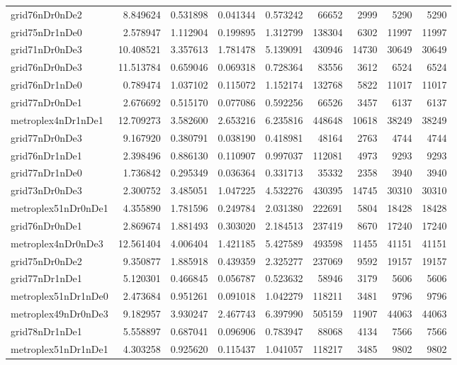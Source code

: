 \begin{longtable}{|l|r|r|r|r|r|r|r|r|}
grid76nDr0nDe2 & 8.849624 & 0.531898 & 0.041344 & 0.573242 & 66652 & 2999 & 5290 & 5290 \\
grid75nDr1nDe0 & 2.578947 & 1.112904 & 0.199895 & 1.312799 & 138304 & 6302 & 11997 & 11997 \\
grid71nDr0nDe3 & 10.408521 & 3.357613 & 1.781478 & 5.139091 & 430946 & 14730 & 30649 & 30649 \\
grid76nDr0nDe3 & 11.513784 & 0.659046 & 0.069318 & 0.728364 & 83556 & 3612 & 6524 & 6524 \\
grid76nDr1nDe0 & 0.789474 & 1.037102 & 0.115072 & 1.152174 & 132768 & 5822 & 11017 & 11017 \\
grid77nDr0nDe1 & 2.676692 & 0.515170 & 0.077086 & 0.592256 & 66526 & 3457 & 6137 & 6137 \\
metroplex4nDr1nDe1 & 12.709273 & 3.582600 & 2.653216 & 6.235816 & 448648 & 10618 & 38249 & 38249 \\
grid77nDr0nDe3 & 9.167920 & 0.380791 & 0.038190 & 0.418981 & 48164 & 2763 & 4744 & 4744 \\
grid76nDr1nDe1 & 2.398496 & 0.886130 & 0.110907 & 0.997037 & 112081 & 4973 & 9293 & 9293 \\
grid77nDr1nDe0 & 1.736842 & 0.295349 & 0.036364 & 0.331713 & 35332 & 2358 & 3940 & 3940 \\
grid73nDr0nDe3 & 2.300752 & 3.485051 & 1.047225 & 4.532276 & 430395 & 14745 & 30310 & 30310 \\
metroplex51nDr0nDe1 & 4.355890 & 1.781596 & 0.249784 & 2.031380 & 222691 & 5804 & 18428 & 18428 \\
grid76nDr0nDe1 & 2.869674 & 1.881493 & 0.303020 & 2.184513 & 237419 & 8670 & 17240 & 17240 \\
metroplex4nDr0nDe3 & 12.561404 & 4.006404 & 1.421185 & 5.427589 & 493598 & 11455 & 41151 & 41151 \\
grid75nDr0nDe2 & 9.350877 & 1.885918 & 0.439359 & 2.325277 & 237069 & 9592 & 19157 & 19157 \\
grid77nDr1nDe1 & 5.120301 & 0.466845 & 0.056787 & 0.523632 & 58946 & 3179 & 5606 & 5606 \\
metroplex51nDr1nDe0 & 2.473684 & 0.951261 & 0.091018 & 1.042279 & 118211 & 3481 & 9796 & 9796 \\
metroplex49nDr0nDe3 & 9.182957 & 3.930247 & 2.467743 & 6.397990 & 505159 & 11907 & 44063 & 44063 \\
grid78nDr1nDe1 & 5.558897 & 0.687041 & 0.096906 & 0.783947 & 88068 & 4134 & 7566 & 7566 \\
metroplex51nDr1nDe1 & 4.303258 & 0.925620 & 0.115437 & 1.041057 & 118217 & 3485 & 9802 & 9802 \\

\end{longtable}
